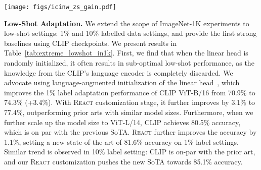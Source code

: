 \documentclass[10pt,twocolumn,letterpaper]{article}
\renewcommand{\paragraph}[1]{\vspace{1.25mm}\noindent\textbf{#1}}
\newcommand{\shortname}{\textsc{React}}
\begin{document}
\begin{figure*}[t!]
	\vspace{-0mm}\centering
\texttt{[image: figs/icinw\_zs\_gain.pdf]} 
	\vspace{-4mm}
	\caption{Zero-shot comparison on \textsc{Elevater} ICinW 20 datasets.  \shortname{} (B32) improves over the base checkpoints on most datasets.
	 }
	\vspace{-3mm}
	\label{fig:icinw_comparison}
\end{figure*}



\paragraph{Low-Shot Adaptation.}
We extend the scope of ImageNet-1K experiments to low-shot settings: 1\% and 10\% labelled data settings, and provide the first strong baselines using CLIP checkpoints.  We present results in Table~\ref{tab:extreme_lowshot_in1k}. First, we find that when the linear head is randomly initialized, it often results in sub-optimal low-shot performance, as the knowledge from the CLIP's language encoder is completely discarded.  We advocate using language-augmented initialization of the linear head~\cite{li2022elevater}, which improves the 1\% label adaptation performance of CLIP ViT-B/16 from 70.9\% to 74.3\% (+3.4\%).  With \shortname{} customization stage, it further improves by 3.1\% to 77.4\%, outperforming prior arts with similar model sizes.  Furthermore, when we further scale up the model size to ViT-L/14, CLIP achieves 80.5\% accuracy, which is on par with the previous SoTA.  \shortname{} further improves the accuracy by 1.1\%, setting a new state-of-the-art of 81.6\% accuracy on 1\% label settings.  Similar trend is observed in 10\% label setting: CLIP is on-par with the prior art, and our \shortname{} customization pushes the new SoTA towards 85.1\% accuracy.
\end{document}

